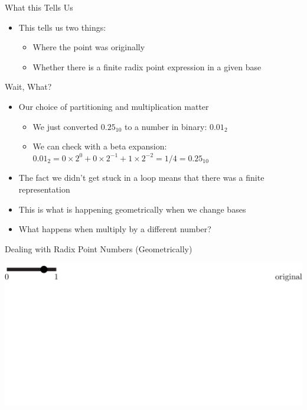 \documentclass{beamer}
\begin{document}
        \begin{frame}{What this Tells Us}
          \begin{itemize}
            \item This tells us two things:
            \begin{itemize}
              \item Where the point was originally
              \item Whether there is a finite radix point expression in a given base
            \end{itemize}
          \end{itemize}
        \end{frame}

        \begin{frame}{Wait, What?}
          \begin{itemize}
            \item Our choice of partitioning and multiplication matter
            \begin{itemize}
              \item We just converted $0.25_{10}$ to a number in binary: $0.01_2$
              \item We can check with a beta expansion: $0.01_2 = 0\times2^{0} + 0\times2^{-1} + 1\times2^{-2} = 1/4 = 0.25_{10}$
            \end{itemize}
            \item The fact we didn't get stuck in a loop means that there was a finite representation
            \item This is what is happening geometrically when we change bases \pause
            \item What happens when multiply by a different number?
          \end{itemize}
        \end{frame}

        \begin{frame}{Dealing with Radix Point Numbers (Geometrically)}
          \begin{example}
            \includegraphics[width=\textwidth,height=0.75\textheight]{images/Ternary/1}
          \end{example}
        \end{frame}
\end{document}
